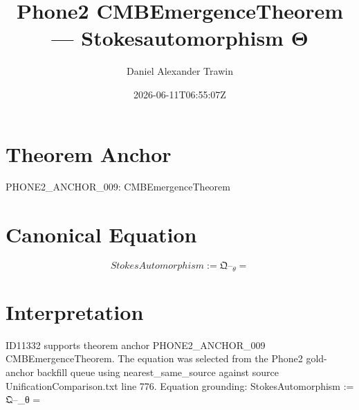 \documentclass[11pt]{article}
\title{Phone2 CMBEmergenceTheorem — Stokesautomorphism Θ}
\author{Daniel Alexander Trawin}
\date{2026-06-11T06:55:07Z}
\begin{document}
\maketitle
\section*{Theorem Anchor}
PHONE2_ANCHOR_009: CMBEmergenceTheorem
\section*{Canonical Equation}
\[
StokesAutomorphism := 𝔔–_θ =
\]
\section*{Interpretation}
ID11332 supports theorem anchor PHONE2_ANCHOR_009 CMBEmergenceTheorem. The equation was selected from the Phone2 gold-anchor backfill queue using nearest_same_source against source UnificationComparison.txt line 776. Equation grounding: StokesAutomorphism := 𝔔–_θ =
\end{document}
